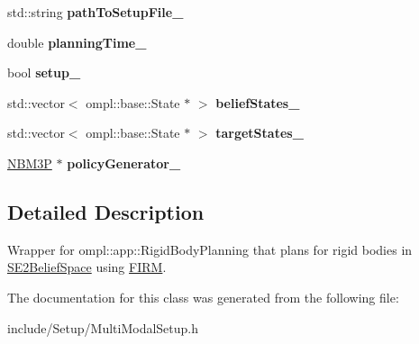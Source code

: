 \begin{DoxyCompactItemize}
\item 
\hypertarget{class_multi_modal_setup_aceb691b4c17ec1247ab6fd311b585a0a}{std\-::string {\bfseries path\-To\-Setup\-File\-\_\-}}\label{class_multi_modal_setup_aceb691b4c17ec1247ab6fd311b585a0a}

\item 
\hypertarget{class_multi_modal_setup_a8bd38c90f4ad1856f4a9448af84c69b8}{double {\bfseries planning\-Time\-\_\-}}\label{class_multi_modal_setup_a8bd38c90f4ad1856f4a9448af84c69b8}

\item 
\hypertarget{class_multi_modal_setup_ac06a13fc5dcd3039fd2b2cc20913cdb5}{bool {\bfseries setup\-\_\-}}\label{class_multi_modal_setup_ac06a13fc5dcd3039fd2b2cc20913cdb5}

\item 
\hypertarget{class_multi_modal_setup_ac28dbccb3fa4142d2203d4080ca6acde}{std\-::vector$<$ ompl\-::base\-::\-State $\ast$ $>$ {\bfseries belief\-States\-\_\-}}\label{class_multi_modal_setup_ac28dbccb3fa4142d2203d4080ca6acde}

\item 
\hypertarget{class_multi_modal_setup_ac20fa2386222bb936b7713b3bf70fc6e}{std\-::vector$<$ ompl\-::base\-::\-State $\ast$ $>$ {\bfseries target\-States\-\_\-}}\label{class_multi_modal_setup_ac20fa2386222bb936b7713b3bf70fc6e}

\item 
\hypertarget{class_multi_modal_setup_a9756fff4c8a591dd809958e49beb0a6a}{\hyperlink{class_n_b_m3_p}{N\-B\-M3\-P} $\ast$ {\bfseries policy\-Generator\-\_\-}}\label{class_multi_modal_setup_a9756fff4c8a591dd809958e49beb0a6a}

\end{DoxyCompactItemize}


\subsection{Detailed Description}
Wrapper for ompl\-::app\-::\-Rigid\-Body\-Planning that plans for rigid bodies in \hyperlink{class_s_e2_belief_space}{S\-E2\-Belief\-Space} using \hyperlink{class_f_i_r_m}{F\-I\-R\-M}. 

The documentation for this class was generated from the following file\-:\begin{DoxyCompactItemize}
\item 
include/\-Setup/Multi\-Modal\-Setup.\-h\end{DoxyCompactItemize}
